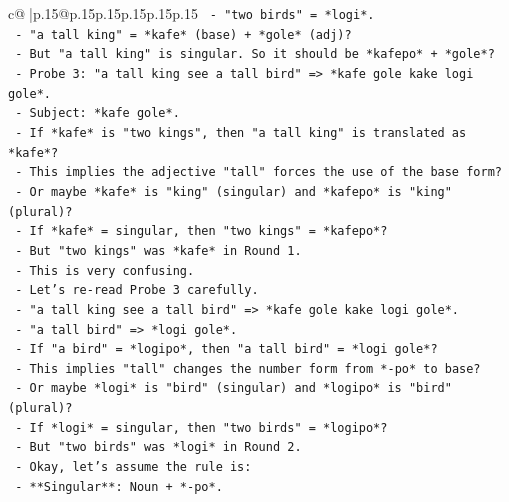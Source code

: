 \documentclass{article}
\begin{document}
{\begin{supertabular}{c@{$\;$}|p{.15\linewidth}@{}p{.15\linewidth}p{.15\linewidth}p{.15\linewidth}p{.15\linewidth}p{.15\linewidth}}
{{{\texttt{                  {-} "two birds" = *logi*.} \\
\texttt{                  {-} "a tall king" = *kafe* (base) + *gole* (adj)?} \\
\texttt{                    {-} But "a tall king" is singular. So it should be *kafepo* + *gole*?} \\
\texttt{                    {-} Probe 3: "a tall king see a tall bird" => *kafe gole kake logi gole*.} \\
\texttt{                    {-} Subject: *kafe gole*.} \\
\texttt{                    {-} If *kafe* is "two kings", then "a tall king" is translated as *kafe*?} \\
\texttt{                    {-} This implies the adjective "tall" forces the use of the base form?} \\
\texttt{                    {-} Or maybe *kafe* is "king" (singular) and *kafepo* is "king" (plural)?} \\
\texttt{                    {-} If *kafe* = singular, then "two kings" = *kafepo*?} \\
\texttt{                    {-} But "two kings" was *kafe* in Round 1.} \\
\texttt{                    {-} This is very confusing.} \\
\texttt{                    {-} Let's re{-}read Probe 3 carefully.} \\
\texttt{                    {-} "a tall king see a tall bird" => *kafe gole kake logi gole*.} \\
\texttt{                    {-} "a tall bird" => *logi gole*.} \\
\texttt{                    {-} If "a bird" = *logipo*, then "a tall bird" = *logi gole*?} \\
\texttt{                    {-} This implies "tall" changes the number form from *{-}po* to base?} \\
\texttt{                    {-} Or maybe *logi* is "bird" (singular) and *logipo* is "bird" (plural)?} \\
\texttt{                    {-} If *logi* = singular, then "two birds" = *logipo*?} \\
\texttt{                    {-} But "two birds" was *logi* in Round 2.} \\
\texttt{                    {-} Okay, let's assume the rule is:} \\
\texttt{                      {-} **Singular**: Noun + *{-}po*.} \\
}}}
\end{supertabular}}
\end{document}

